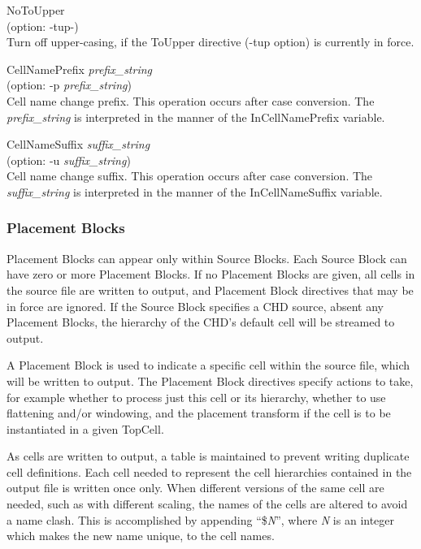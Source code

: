 \begin{description}
\item{\vt NoToUpper}\\
(option: {\vt -tup-})\\
Turn off upper-casing, if the {\vt ToUpper} directive ({\vt -tup}
option) is currently in force.

\item{\vt CellNamePrefix} {\it prefix\_string}\\
(option: {\vt -p} {\it prefix\_string})\\
Cell name change prefix.  This operation occurs after case conversion. 
The {\it prefix\_string} is interpreted in the manner of the {\et
InCellNamePrefix} variable.

\item{\vt CellNameSuffix} {\it suffix\_string}\\
(option: {\vt -u} {\it suffix\_string})\\
Cell name change suffix.  This operation occurs after case conversion. 
The {\it suffix\_string} is interpreted in the manner of the {\et
InCellNameSuffix} variable.
\end{description}

\subsubsection{Placement Blocks}

Placement Blocks can appear only within Source Blocks.  Each Source
Block can have zero or more Placement Blocks.  If no Placement Blocks
are given, all cells in the source file are written to output, and
Placement Block directives that may be in force are ignored.  If the
Source Block specifies a CHD source, absent any Placement Blocks, the
hierarchy of the CHD's default cell will be streamed to output.

A Placement Block is used to indicate a specific cell within the
source file, which will be written to output.  The Placement Block
directives specify actions to take, for example whether to process
just this cell or its hierarchy, whether to use flattening and/or
windowing, and the placement transform if the cell is to be
instantiated in a given {\vt TopCell}.

As cells are written to output, a table is maintained to prevent
writing duplicate cell definitions.  Each cell needed to represent the
cell hierarchies contained in the output file is written once only. 
When different versions of the same cell are needed, such as with
different scaling, the names of the cells are altered to avoid a name
clash.  This is accomplished by appending ``{\vt \$}{\it N\/}'', where
{\it N} is an integer which makes the new name unique, to the cell
names.

